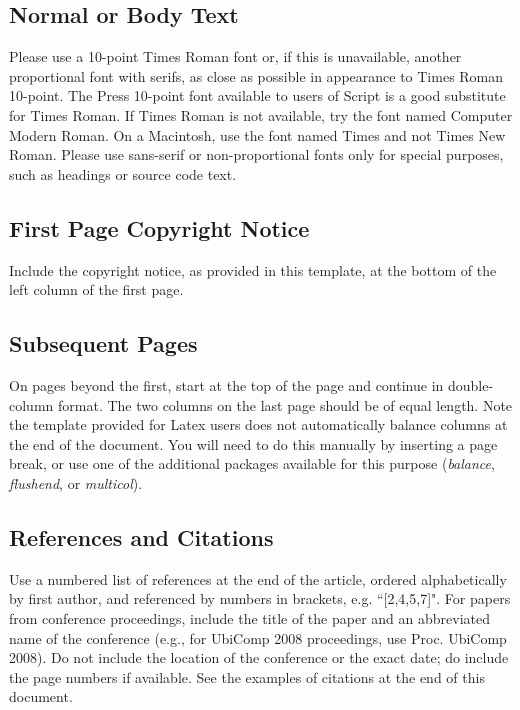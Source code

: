 \documentclass{ubicomp2013}
\begin{document}
\subsection{Normal or Body Text}

Please use a 10-point Times Roman font or, if this is unavailable,
another proportional font with serifs, as close as possible in
appearance to Times Roman 10-point. The Press 10-point font available
to users of Script is a good substitute for Times Roman. If Times
Roman is not available, try the font named Computer Modern Roman. On a
Macintosh, use the font named Times and not Times New Roman. Please
use sans-serif or non-proportional fonts only for special purposes,
such as headings or source code text.

\subsection{First Page Copyright Notice}

Include the copyright notice, as provided in this template, at the bottom of the left column of the first page.
\subsection{Subsequent Pages}

On pages beyond the first, start at the top of the page and continue
in double-column format.  The two columns on the last page should be
of equal length. Note the template provided for Latex users does not automatically balance columns at the end of the document. You will need to do this manually by inserting a page break, or use one of the additional packages available for this purpose (\emph{balance}, \emph{flushend}, or \emph{multicol}).

\subsection{References and Citations}

Use a numbered list of references at the end of the article, ordered
alphabetically by first author, and referenced by numbers in brackets, e.g.
``[2,4,5,7]". For papers from conference proceedings, include the title
of the paper and an abbreviated name of the conference (e.g., for
UbiComp 2008 proceedings, use Proc. UbiComp 2008). Do not include
the location of the conference or the exact date; do include the page
numbers if available. See the examples of citations at the end of this
document.
\end{document}
